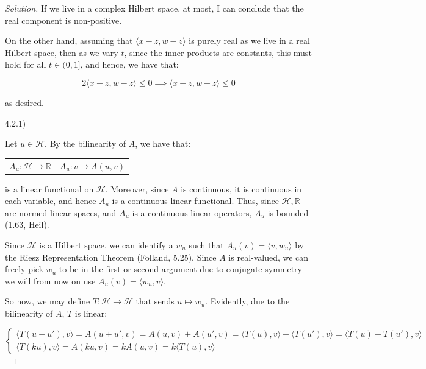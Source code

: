 \documentclass[10pt]{article}
\begin{document}
\begin{proof}[Solution]
If we live in a complex Hilbert space, at most, I can conclude that the real component is non-positive.

On the other hand, assuming that $\langle x - z, w - z \rangle$ is purely real as we live in a real Hilbert space, then as we vary $t$, since the inner products are constants, this must hold for all $t \in (0,1]$, and hence, we have that:

$$ 2 \langle x - z, w - z \rangle \leq 0 \implies \langle x - z, w - z \rangle \leq 0 $$

as desired.

4.2.1)

Let $u  \in \mathcal{H}$. By the bilinearity of $A$, we have that:
\begin{center}
\begin{tabular}{c c} $A_u : \mathcal{H} \to \mathbb{R}$ & $A_u: v \mapsto A(u,v) $\end{tabular}
\end{center}

is a linear functional on $\mathcal{H}$. Moreover, since $A$ is continuous, it is continuous in each variable, and hence $A_u$ is a continuous linear functional. Thus, since $\mathcal{H}, \mathbb{R}$ are normed linear spaces, and $A_u$ is a continuous linear operators, $A_u$ is bounded (1.63, Heil).

Since $\mathcal{H}$ is a Hilbert space, we can identify a $w_u$ such that $A_u(v) = \langle v, w_u \rangle$ by the Riesz Representation Theorem (Folland, 5.25). Since $A$ is real-valued, we can freely pick $w_u$ to be in the first or second argument due to conjugate symmetry - we will from now on use $A_u(v) = \langle w_u, v\rangle$.

So now, we may define $T: \mathcal{H} \to \mathcal{H}$ that sends $u \mapsto w_u$. Evidently, due to the bilinearity of $A$, $T$ is linear:

$$\begin{cases} \langle T(u + u'), v \rangle = A(u + u', v) = A(u, v) + A(u', v) = \langle T(u), v \rangle + \langle T(u'), v \rangle = \langle T(u) + T(u'), v \rangle \\ \langle T(ku), v \rangle =A(ku, v) = k A(u, v) = k \langle T(u), v \rangle \end{cases} $$ 




\end{proof}
\end{document}
